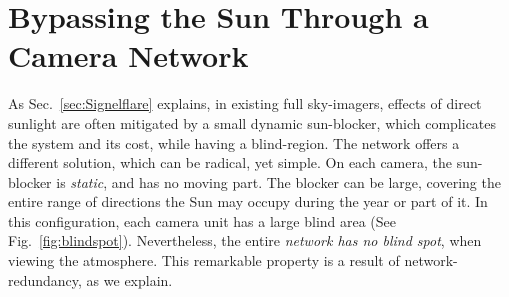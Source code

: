 \documentclass[runningheads]{llncs}
\begin{document}
\section{Bypassing the Sun Through a Camera Network}
\label{sec:mutiSun}

As Sec.~\ref{sec:Signelflare} explains, in existing full sky-imagers, effects of direct sunlight are often mitigated by a small dynamic sun-blocker, which complicates the system and its cost, while having a blind-region. The network offers a different solution, which can be radical, yet simple. On each camera, the sun-blocker is {\em static}, and has no moving part. The blocker can be large, covering the entire range of directions the Sun may occupy during the year or part of it. In this configuration, each camera unit has a large blind area (See Fig.~\ref{fig:blindspot}). Nevertheless, the entire {\em network has no blind spot}, when viewing the atmosphere. This remarkable property is a result of network-redundancy, as we explain.
\end{document}
